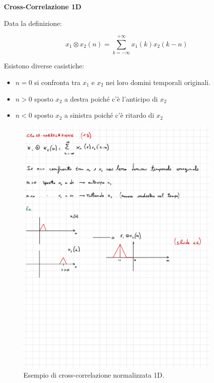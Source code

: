 \documentclass[a4paper]{article}
\begin{document}
	\newpage
	
	\noindent
	\textcolor{Green4}{\textbf{Cross-Correlazione 1D}}\newline
	
	\noindent
	Data la definizione:
	
	\begin{equation*}
		x_{1} \otimes x_{2}\left(n\right) = \sum_{k = -\infty}^{+\infty} x_{1}\left(k\right) x_{2}\left(k - n\right)
	\end{equation*}
	
	\noindent
	Esistono diverse casistiche:
	
	\begin{itemize}
		\item $n = 0$ si confronta tra $x_{1}$ e $x_{2}$ nei loro domini temporali originali.
		
		\item $n > 0$ sposto $x_{2}$ a destra poiché c'è l'anticipo di $x_{2}$
		
		\item $n < 0$ sposto $x_{2}$ a sinistra poiché c'è ritardo di $x_{2}$
	\end{itemize}

	\begin{figure}[!htp]
		\centering
		\includegraphics[width=0.9\textwidth]{img/ex_exam/eg_cross-correlazione-1D.pdf}
		\caption{Esempio di cross-correlazione normalizzata 1D.}
	\end{figure}
\end{document}

